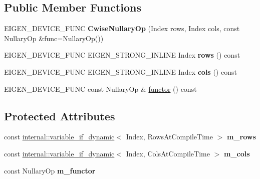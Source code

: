 \subsection*{Public Member Functions}
\begin{DoxyCompactItemize}
\item 
\mbox{\label{class_eigen_1_1_cwise_nullary_op_a09f117dd75bbd9708e1c3bcc181b3599}} 
E\+I\+G\+E\+N\+\_\+\+D\+E\+V\+I\+C\+E\+\_\+\+F\+U\+NC {\bfseries Cwise\+Nullary\+Op} (Index rows, Index cols, const Nullary\+Op \&func=Nullary\+Op())
\item 
\mbox{\label{class_eigen_1_1_cwise_nullary_op_a012b3e39048f36db283c4deedcd2e837}} 
E\+I\+G\+E\+N\+\_\+\+D\+E\+V\+I\+C\+E\+\_\+\+F\+U\+NC E\+I\+G\+E\+N\+\_\+\+S\+T\+R\+O\+N\+G\+\_\+\+I\+N\+L\+I\+NE Index {\bfseries rows} () const
\item 
\mbox{\label{class_eigen_1_1_cwise_nullary_op_a25261add5535e650251d9dc12a892f28}} 
E\+I\+G\+E\+N\+\_\+\+D\+E\+V\+I\+C\+E\+\_\+\+F\+U\+NC E\+I\+G\+E\+N\+\_\+\+S\+T\+R\+O\+N\+G\+\_\+\+I\+N\+L\+I\+NE Index {\bfseries cols} () const
\item 
E\+I\+G\+E\+N\+\_\+\+D\+E\+V\+I\+C\+E\+\_\+\+F\+U\+NC const Nullary\+Op \& \mbox{\hyperlink{class_eigen_1_1_cwise_nullary_op_abef8b2e7bcbcfa98c49caf0a1391ee47}{functor}} () const
\end{DoxyCompactItemize}
\subsection*{Protected Attributes}
\begin{DoxyCompactItemize}
\item 
\mbox{\label{class_eigen_1_1_cwise_nullary_op_a4f004d830b6463d584244520880baf9a}} 
const \mbox{\hyperlink{class_eigen_1_1internal_1_1variable__if__dynamic}{internal\+::variable\+\_\+if\+\_\+dynamic}}$<$ Index, Rows\+At\+Compile\+Time $>$ {\bfseries m\+\_\+rows}
\item 
\mbox{\label{class_eigen_1_1_cwise_nullary_op_a116f2786d01eed873dc5889ce442cbf8}} 
const \mbox{\hyperlink{class_eigen_1_1internal_1_1variable__if__dynamic}{internal\+::variable\+\_\+if\+\_\+dynamic}}$<$ Index, Cols\+At\+Compile\+Time $>$ {\bfseries m\+\_\+cols}
\item 
\mbox{\label{class_eigen_1_1_cwise_nullary_op_ac7355f935292f705935d7a3aec6caad3}} 
const Nullary\+Op {\bfseries m\+\_\+functor}
\end{DoxyCompactItemize}



